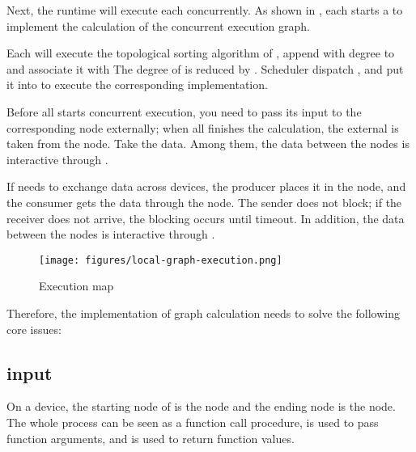 \begin{content}
Next, the runtime will execute each  concurrently. As shown in , each  starts a  to implement the calculation of the concurrent execution graph.

Each  will execute the topological sorting algorithm of , append  with degree  to  and associate it with The degree of  is reduced by . Scheduler dispatch , and put it into  to execute the corresponding  implementation.

Before all  starts concurrent execution, you need to pass its input to the corresponding  node externally; when all  finishes the calculation, the external is taken from the  node. Take the data. Among them, the data between the  nodes is interactive through .

If  needs to exchange data across devices, the producer places it in the  node, and the consumer gets the data through the  node. The sender does not block; if the receiver does not arrive, the blocking occurs until timeout. In addition, the data between the  nodes is interactive through .

\begin{figure}[H]
\centering
\texttt{[image: figures/local-graph-execution.png]}
\caption{Execution map}
 \label{fig:local-graph-execution}
\end{figure}

Therefore, the implementation of graph calculation needs to solve the following  core issues:

\begin{enum}
\end{enum}

\subsection{input}

On a device, the starting node of  is the  node and the ending node is the  node. The whole process can be seen as a function call procedure,  is used to pass function arguments, and  is used to return function values.


\end{content}
